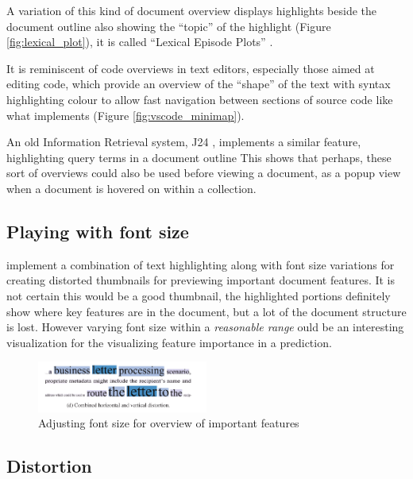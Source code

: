 \documentclass{l4proj}
\begin{document}
A variation of this kind of document overview displays highlights beside the document outline also showing the ``topic'' of the highlight (Figure \ref{fig:lexical_plot}), it is called ``Lexical Episode Plots'' \autocite{el-assadyVisArgueVisualText2016,goldExploratoryTextAnalysis2015}.

It is reminiscent of code overviews in text editors, especially those aimed at editing code, which provide an overview of the ``shape'' of the text with syntax highlighting colour to allow fast navigation between sections of source code like what \textcite{MicrosoftVscode2020} implements (Figure \ref{fig:vscode_minimap}).

An old Information Retrieval system, J24 \autocite[7]{ogdenDocumentThumbnailVisualizations1998}, implements a similar feature, highlighting query terms in a document outline
This shows that perhaps, these sort of overviews could also be used before viewing a document, as a popup view when a document is hovered on within a collection.

\subsection{Playing with font size}

\textcite{stoffelDocumentThumbnailsVariable2012} implement a combination of text highlighting along with font size variations for creating distorted thumbnails for previewing important document features.
It is not certain this would be a good thumbnail, the highlighted portions definitely show where key features are in the document, but a lot of the document structure is lost.
However varying font size within a \textit{reasonable range} ould be an interesting visualization for the visualizing feature importance in a prediction.

\begin{figure}[H]
    \centering
    \includegraphics[width=0.5\textwidth]{images/document_visualization/font-size.png}
    \caption{Adjusting font size for overview of important features \\ \protect\autocite{stoffelDocumentThumbnailsVariable2012}}
    \label{fig:font-size}
\end{figure}


\subsection{Distortion}
\end{document}
